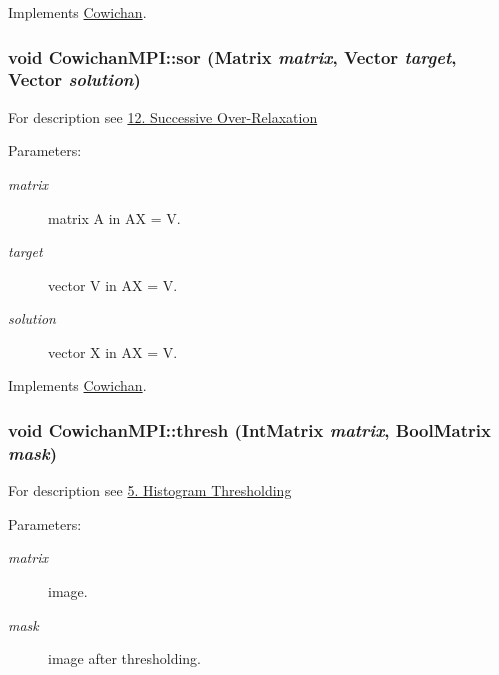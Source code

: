 Implements \hyperlink{class_cowichan_c44cacf9d9e363a5b076bcee8b9a7a73}{Cowichan}.\hypertarget{class_cowichan_m_p_i_7388c844e8aa73ab0923443a3a7ef069}{
\subsubsection[{sor}]{\setlength{\rightskip}{0pt plus 5cm}void CowichanMPI::sor ({\bf Matrix} {\em matrix}, \/  {\bf Vector} {\em target}, \/  {\bf Vector} {\em solution})}}
\label{class_cowichan_m_p_i_7388c844e8aa73ab0923443a3a7ef069}


For description see \hyperlink{index_sor_sec}{12. Successive Over-Relaxation} \begin{Desc}
\item[Parameters:]
\begin{description}
\item[{\em matrix}]matrix A in AX = V. \item[{\em target}]vector V in AX = V. \item[{\em solution}]vector X in AX = V. \end{description}
\end{Desc}


Implements \hyperlink{class_cowichan_92d8d9ae77208115fdfe69e1174f601c}{Cowichan}.\hypertarget{class_cowichan_m_p_i_49ff96b091a61e9cfd9aad8824e7fbbd}{
\subsubsection[{thresh}]{\setlength{\rightskip}{0pt plus 5cm}void CowichanMPI::thresh ({\bf IntMatrix} {\em matrix}, \/  {\bf BoolMatrix} {\em mask})}}
\label{class_cowichan_m_p_i_49ff96b091a61e9cfd9aad8824e7fbbd}


For description see \hyperlink{index_thresh_sec}{5. Histogram Thresholding} \begin{Desc}
\item[Parameters:]
\begin{description}
\item[{\em matrix}]image. \item[{\em mask}]image after thresholding. \end{description}
\end{Desc}


